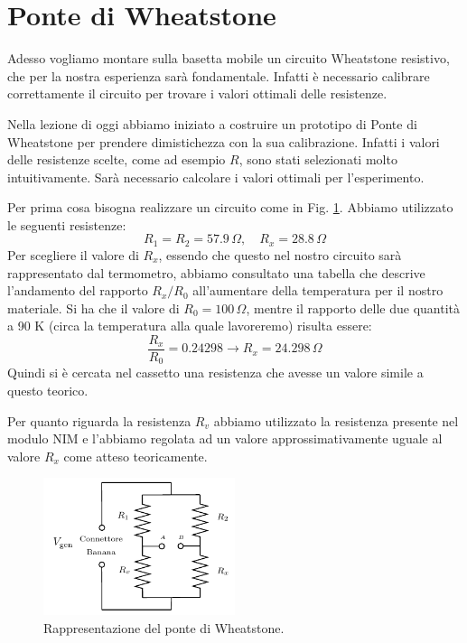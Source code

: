 \documentclass[../main/main.tex]{subfiles}
\begin{document}
\section{Ponte di Wheatstone}

Adesso vogliamo montare sulla basetta mobile un circuito Wheatstone resistivo, che per la nostra esperienza sarà fondamentale. Infatti è necessario calibrare correttamente il circuito per trovare i valori ottimali delle resistenze.

Nella lezione di oggi abbiamo iniziato a costruire un prototipo di Ponte di Wheatstone per prendere dimistichezza con la sua calibrazione. Infatti i valori delle resistenze scelte, come ad esempio \( R \), sono stati selezionati molto intuitivamente. Sarà necessario calcolare i valori ottimali per l'esperimento.

Per prima cosa bisogna realizzare un circuito come in Fig. \ref{fig:1_1}.
Abbiamo utilizzato le seguenti resistenze:
\begin{equation*}
  R_1=R_2=57.9 \, \Omega, \quad R_x=28.8\, \Omega
\end{equation*}
Per scegliere il valore di \( R_x \), essendo che questo nel nostro circuito sarà rappresentato dal termometro, abbiamo consultato una tabella che descrive l'andamento del rapporto \( R_x/R_0 \) all'aumentare della temperatura per il nostro materiale. Si ha che il valore di \( R_0 = 100 \, \Omega  \), mentre il rapporto delle due quantità a 90 K (circa la temperatura alla quale lavoreremo) risulta essere:
\begin{equation*}
  \frac{R_x}{R_0} = 0.24298 \longrightarrow R_x = 24.298 \, \Omega
\end{equation*}
Quindi si è cercata nel cassetto una resistenza che avesse un valore simile a questo teorico.

Per quanto riguarda la resistenza \( R_v \) abbiamo utilizzato la resistenza presente nel modulo NIM e l'abbiamo regolata ad un valore approssimativamente uguale al valore \( R_x \) come atteso teoricamente.

\begin{figure}[h!]
\centering
\includegraphics[width=0.5\textwidth]{../lessons/image/01/1.pdf}
\caption{\label{fig:1_1} Rappresentazione del ponte di Wheatstone.}
\end{figure}
\end{document}
